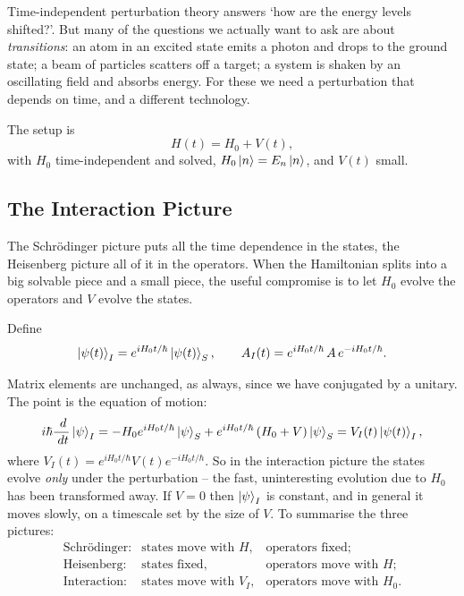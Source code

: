 \documentclass[a4paper]{scrartcl}
\begin{document}
Time-independent perturbation theory answers `how are the energy levels shifted?'. But many of the questions we actually want to ask are about \emph{transitions}: an atom in an excited state emits a photon and drops to the ground state; a beam of particles scatters off a target; a system is shaken by an oscillating field and absorbs energy. For these we need a perturbation that depends on time, and a different technology.

The setup is
$$
H(t) = H_0 + V(t),
$$
with $H_0$ time-independent and solved, $H_0\ket{n} = E_n\ket{n}$, and $V(t)$ small.

\subsection{The Interaction Picture}

The Schr\"odinger picture puts all the time dependence in the states, the Heisenberg picture all of it in the operators. When the Hamiltonian splits into a big solvable piece and a small piece, the useful compromise is to let $H_0$ evolve the operators and $V$ evolve the states.

\begin{definition}
    Define
    $$
    \ket{\psi(t)}_I = e^{iH_0t/\hbar}\ket{\psi(t)}_S, \qquad A_I(t) = e^{iH_0t/\hbar}\,A\,e^{-iH_0t/\hbar}.
    $$
\end{definition}

Matrix elements are unchanged, as always, since we have conjugated by a unitary. The point is the equation of motion:
$$
i\hbar\frac{\; d}{\; d t}\ket{\psi}_I = -H_0 e^{iH_0t/\hbar}\ket\psi_S + e^{iH_0 t/\hbar}\left( H_0 + V \right)\ket\psi_S = V_I(t)\ket{\psi(t)}_I,
$$
where $V_I(t) = e^{iH_0t/\hbar}V(t)e^{-iH_0t/\hbar}$. So in the interaction picture the states evolve \emph{only} under the perturbation -- the fast, uninteresting evolution due to $H_0$ has been transformed away. If $V = 0$ then $\ket\psi_I$ is constant, and in general it moves slowly, on a timescale set by the size of $V$. To summarise the three pictures:
$$
\begin{array}{lll}
\text{Schr\"odinger:} & \text{states move with } H, & \text{operators fixed};\\
\text{Heisenberg:} & \text{states fixed}, & \text{operators move with } H;\\
\text{Interaction:} & \text{states move with } V_I, & \text{operators move with } H_0.
\end{array}
$$
\end{document}
